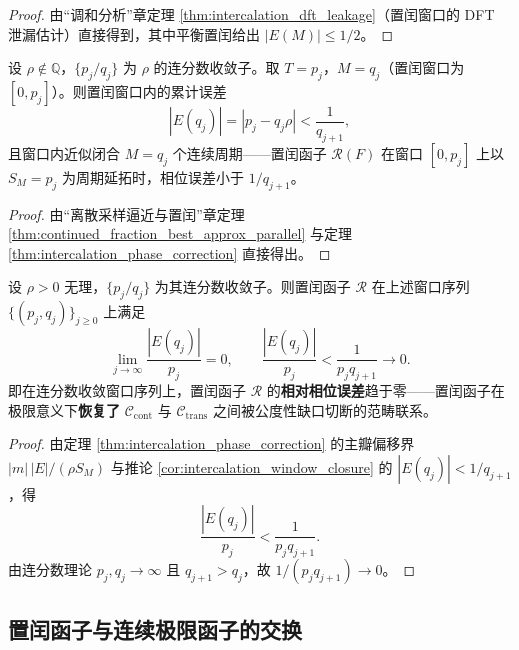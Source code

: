 \begin{proof}
由“调和分析”章定理 \ref{thm:intercalation_dft_leakage}（置闰窗口的 DFT 泄漏估计）直接得到，其中平衡置闰给出 $|E(M)|\le 1/2$。
\end{proof}

\begin{corollary}[置闰窗口的相位闭合]\label{cor:intercalation_window_closure}
设 $\rho\notin\mathbb{Q}$，$\{p_j/q_j\}$ 为 $\rho$ 的连分数收敛子。取 $T=p_j$，$M=q_j$（置闰窗口为 $[0,p_j]$）。则置闰窗口内的累计误差
\[
|E(q_j)|=|p_j-q_j\rho|<\frac{1}{q_{j+1}},
\]
且窗口内近似闭合 $M=q_j$ 个连续周期——置闰函子 $\mathcal{R}(F)$ 在窗口 $[0,p_j]$ 上以 $S_M=p_j$ 为周期延拓时，相位误差小于 $1/q_{j+1}$。
\end{corollary}

\begin{proof}
由“离散采样逼近与置闰”章定理 \ref{thm:continued_fraction_best_approx_parallel} 与定理 \ref{thm:intercalation_phase_correction} 直接得出。
\end{proof}

\begin{theorem}[连分数最佳置闰函子的普适性]\label{thm:intercalation_continued_fraction}
设 $\rho>0$ 无理，$\{p_j/q_j\}$ 为其连分数收敛子。则置闰函子 $\mathcal{R}$ 在上述窗口序列 $\{(p_j,q_j)\}_{j\ge 0}$ 上满足
\[
\lim_{j\to\infty}\frac{|E(q_j)|}{p_j}=0,\qquad
\frac{|E(q_j)|}{p_j}<\frac{1}{p_j q_{j+1}}\to 0.
\]
即在连分数收敛窗口序列上，置闰函子 $\mathcal{R}$ 的\textbf{相对相位误差}趋于零——置闰函子在极限意义下\textbf{恢复了} $\mathcal{C}_{\text{cont}}$ 与 $\mathcal{C}_{\text{trans}}$ 之间被公度性缺口切断的范畴联系。
\end{theorem}

\begin{proof}
由定理 \ref{thm:intercalation_phase_correction} 的主瓣偏移界 $|m|\,|E|/(\rho S_M)$ 与推论 \ref{cor:intercalation_window_closure} 的 $|E(q_j)|<1/q_{j+1}$，得
\[
\frac{|E(q_j)|}{p_j}<\frac{1}{p_j q_{j+1}}.
\]
由连分数理论 $p_j,q_j\to\infty$ 且 $q_{j+1}>q_j$，故 $1/(p_j q_{j+1})\to 0$。
\end{proof}

\subsection{置闰函子与连续极限函子的交换}

